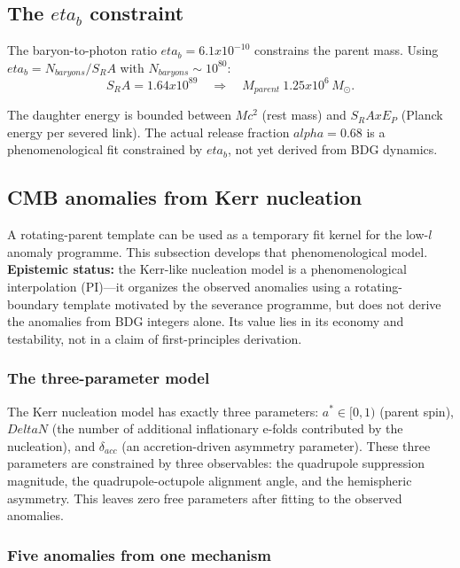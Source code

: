 \documentclass[11pt]{article}
\def\ell{l}%
\def\Delta{Delta}%
\def\alpha{alpha}%
\def\eta{eta}%
\def\mathrm#1{#1}%
\def\times{x}%
\def\approx{~}%
\def\SRa{S_RA}%
\newcommand{\SRa}{S_{\mathrm{RA}}}
\begin{document}
\subsection{The $\eta_b$ constraint}

The baryon-to-photon ratio $\eta_b=6.1\times 10^{-10}$ constrains the parent mass. Using $\eta_b=N_{\mathrm{baryons}}/\SRa$ with $N_{\mathrm{baryons}}\sim 10^{80}$:
\begin{equation}
\SRa = 1.64\times 10^{89} \quad\Longrightarrow\quad M_{\mathrm{parent}}\approx 1.25\times 10^6\,M_\odot.
\end{equation}

The daughter energy is bounded between $Mc^2$ (rest mass) and $\SRa\times E_P$ (Planck energy per severed link). The actual release fraction $\alpha=0.68$ is a phenomenological fit constrained by $\eta_b$, not yet derived from BDG dynamics.

\subsection{CMB anomalies from Kerr nucleation}
\label{sec:cmb_anomalies}

A rotating-parent template can be used as a temporary fit kernel for the low-$\ell$ anomaly programme. This subsection develops that phenomenological model. \textbf{Epistemic status:} the Kerr-like nucleation model is a phenomenological interpolation (PI)---it organizes the observed anomalies using a rotating-boundary template motivated by the severance programme, but does not derive the anomalies from BDG integers alone. Its value lies in its economy and testability, not in a claim of first-principles derivation.

\subsubsection{The three-parameter model}

The Kerr nucleation model has exactly three parameters: $a^* \in [0, 1)$ (parent spin), $\Delta N$ (the number of additional inflationary e-folds contributed by the nucleation), and $\delta_{\mathrm{acc}}$ (an accretion-driven asymmetry parameter). These three parameters are constrained by three observables: the quadrupole suppression magnitude, the quadrupole-octupole alignment angle, and the hemispheric asymmetry. This leaves zero free parameters after fitting to the observed anomalies.

\subsubsection{Five anomalies from one mechanism}
\end{document}
